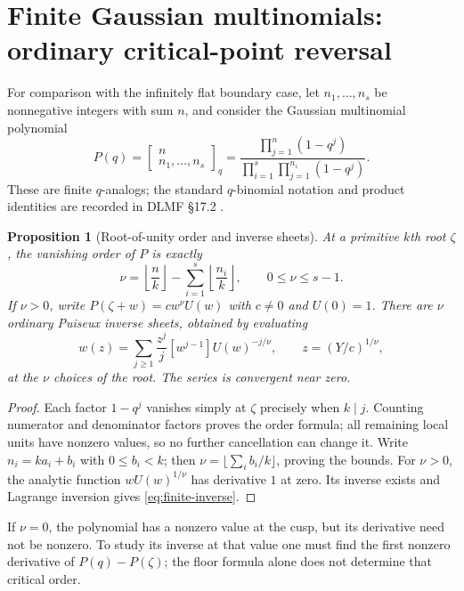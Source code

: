 \documentclass[11pt,a4paper]{article}
\numberwithin{equation}{section}
\newtheorem{proposition}[theorem]{Proposition}
\theoremstyle{definition}\newtheorem{definition}[theorem]{Definition}
\theoremstyle{remark}\newtheorem{remark}[theorem]{Remark}
\begin{document}
\section{Finite Gaussian multinomials: ordinary critical-point reversal}
\label{sec:finite}
For comparison with the infinitely flat boundary case, let
$n_1,\ldots,n_s$ be nonnegative integers with sum $n$, and consider the
Gaussian multinomial polynomial
\begin{equation}\label{eq:qmultinomial}
 P(q)=\begin{bmatrix}n\\n_1,\ldots,n_s\end{bmatrix}_q
 =\frac{\prod_{j=1}^n(1-q^j)}
        {\prod_{i=1}^s\prod_{j=1}^{n_i}(1-q^j)}.
\end{equation}
These are finite $q$-analogs; the standard $q$-binomial notation and
product identities are recorded in DLMF \S17.2 \cite{dlmfq}.

\begin{proposition}[Root-of-unity order and inverse sheets]
\label{prop:finite}
At a primitive $k$th root $\zeta$, the vanishing order of $P$ is exactly
\begin{equation}\label{eq:finite-order}
 \nu=\left\lfloor\frac nk\right\rfloor
       -\sum_{i=1}^s\left\lfloor\frac{n_i}{k}\right\rfloor,
 \qquad 0\le\nu\le s-1.
\end{equation}
If $\nu>0$, write
$P(\zeta+w)=c w^\nu U(w)$ with $c\ne0$ and $U(0)=1$.
There are $\nu$ ordinary Puiseux inverse sheets, obtained by evaluating
\begin{equation}\label{eq:finite-inverse}
 w(z)=\sum_{j\ge1}\frac{z^j}{j}[w^{j-1}]U(w)^{-j/\nu},
 \qquad z=(Y/c)^{1/\nu},
\end{equation}
at the $\nu$ choices of the root. The series is convergent near zero.
\end{proposition}
\begin{proof}
Each factor $1-q^j$ vanishes simply at $\zeta$ precisely when $k\mid j$.
Counting numerator and denominator factors proves the order formula;
all remaining local units have nonzero values, so no further cancellation
can change it. Write $n_i=k a_i+b_i$ with $0\le b_i<k$; then
$\nu=\lfloor\sum_i b_i/k\rfloor$, proving the bounds. For $\nu>0$,
the analytic function $wU(w)^{1/\nu}$ has derivative $1$ at zero.
Its inverse exists and Lagrange inversion gives \eqref{eq:finite-inverse}.
\end{proof}
If $\nu=0$, the polynomial has a nonzero value at the cusp, but its
derivative need not be nonzero. To study its inverse at that value one
must find the first nonzero derivative of $P(q)-P(\zeta)$; the floor
formula alone does not determine that critical order.
\end{document}
